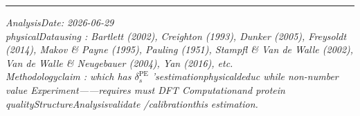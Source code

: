 \documentclass[
  12pt,
]{article}
\begin{document}
\begin{center}\rule{0.5\linewidth}{0.5pt}\end{center}

\emph{AnalysisDate: 2026-06-29}\\
\emph{physicalDatausing : Bartlett (2002), Creighton (1993), Dunker (2005),
Freysoldt (2014), Makov \& Payne (1995), Pauling (1951), Stampfl \& Van
de Walle (2002), Van de Walle \& Neugebauer (2004), Yan (2016), etc.}\\
\emph{Methodologyclaim : which has  \(\delta_s^{\text{PE}}\)
'sestimationphysicaldeduc while non-number value Experiment------requires must  DFT
Computationand protein qualityStructureAnalysisvalidate /calibrationthis estimation. }
\end{document}
